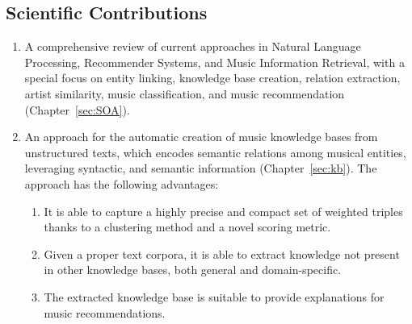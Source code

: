 \subsection{Scientific Contributions}

\begin{enumerate}

\item 
A comprehensive review of current approaches in Natural Language Processing, Recommender Systems, and Music Information Retrieval, with a special focus on entity linking, knowledge base creation, relation extraction, artist similarity, music classification, and music recommendation (Chapter~\ref{sec:SOA}).


\item 
An approach for the automatic creation of music knowledge bases from unstructured texts, which encodes semantic relations among musical entities, leveraging syntactic, and semantic information (Chapter~\ref{sec:kb}). %
The approach has the following advantages:

\begin{enumerate}
\item 
It is able to capture a highly precise and compact set of weighted triples thanks to a clustering method and a novel scoring metric. 
\item 
Given a proper text corpora, it is able to extract knowledge not present in other knowledge bases, both general and domain-specific. 
\item
The extracted knowledge base is suitable to provide explanations for music recommendations.
\end{enumerate}


\end{enumerate}
